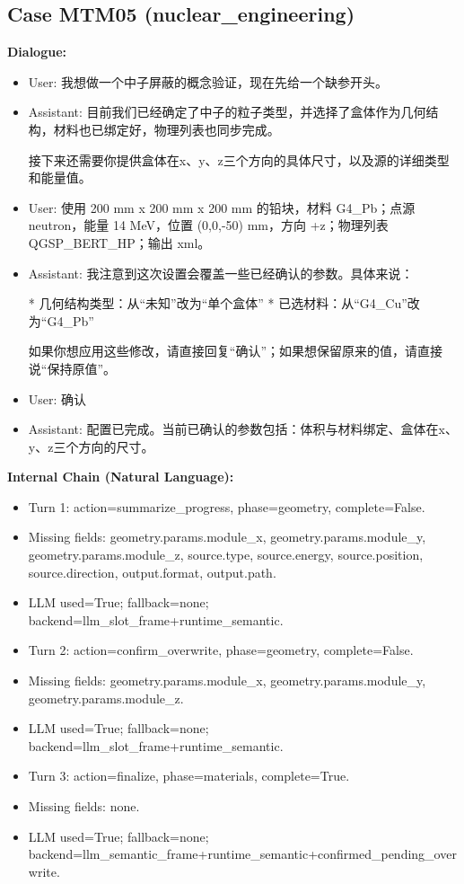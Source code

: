 \documentclass[11pt]{ctexart}
\begin{document}
\subsection{Case MTM05 (nuclear\_engineering)}
\textbf{Dialogue:}
\begin{itemize}
\item User: 我想做一个中子屏蔽的概念验证，现在先给一个缺参开头。
\item Assistant: 目前我们已经确定了中子的粒子类型，并选择了盒体作为几何结构，材料也已绑定好，物理列表也同步完成。

接下来还需要你提供盒体在x、y、z三个方向的具体尺寸，以及源的详细类型和能量值。
\item User: 使用 200 mm x 200 mm x 200 mm 的铅块，材料 G4\_Pb；点源 neutron，能量 14 MeV，位置 (0,0,-50) mm，方向 +z；物理列表 QGSP\_BERT\_HP；输出 xml。
\item Assistant: 我注意到这次设置会覆盖一些已经确认的参数。具体来说：

*   几何结构类型：从“未知”改为“单个盒体”
*   已选材料：从“G4\_Cu”改为“G4\_Pb”

如果你想应用这些修改，请直接回复“确认”；如果想保留原来的值，请直接说“保持原值”。
\item User: 确认
\item Assistant: 配置已完成。当前已确认的参数包括：体积与材料绑定、盒体在x、y、z三个方向的尺寸。
\end{itemize}
\textbf{Internal Chain (Natural Language):}
\begin{itemize}
\item Turn 1: action=summarize\_progress, phase=geometry, complete=False.
\item Missing fields: geometry.params.module\_x, geometry.params.module\_y, geometry.params.module\_z, source.type, source.energy, source.position, source.direction, output.format, output.path.
\item LLM used=True; fallback=none; backend=llm\_slot\_frame+runtime\_semantic.
\item Turn 2: action=confirm\_overwrite, phase=geometry, complete=False.
\item Missing fields: geometry.params.module\_x, geometry.params.module\_y, geometry.params.module\_z.
\item LLM used=True; fallback=none; backend=llm\_slot\_frame+runtime\_semantic.
\item Turn 3: action=finalize, phase=materials, complete=True.
\item Missing fields: none.
\item LLM used=True; fallback=none; backend=llm\_semantic\_frame+runtime\_semantic+confirmed\_pending\_overwrite.
\end{itemize}
\end{document}
